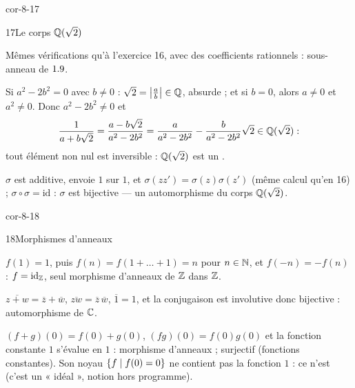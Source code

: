 \begin{blocLivre}{cor-8-17}
\begin{corrige}{17}{Le corps $\mathbb{Q}(\sqrt2)$}
\begin{questions}
  \item Mêmes vérifications qu'à l'exercice 16, avec des coefficients
    rationnels : sous-anneau de $1.9$.
  \item Si $a^{2}-2b^{2}=0$ avec $b\neq0$ : $\sqrt2=\bigl|\frac ab\bigr|\in\mathbb{Q}$,
    absurde ; et si $b=0$, alors $a\neq0$ et $a^{2}\neq0$. Donc
    $a^{2}-2b^{2}\neq0$ et
    \[
      \frac{1}{a+b\sqrt2}=\frac{a-b\sqrt2}{a^{2}-2b^{2}}
      =\frac{a}{a^{2}-2b^{2}}-\frac{b}{a^{2}-2b^{2}}\sqrt2\in\mathbb{Q}(\sqrt2) :
    \]
    tout élément non nul est inversible : $\mathbb{Q}(\sqrt2)$ est un
    .
  \item $\sigma$ est additive, envoie $1$ sur $1$, et
    $\sigma(zz')=\sigma(z)\sigma(z')$ (même calcul qu'en 16) ;
    $\sigma\circ\sigma=\mathrm{id}$ : $\sigma$ est bijective — un
    automorphisme du corps $\mathbb{Q}(\sqrt2)$.
\end{questions}
\end{corrige}
\end{blocLivre}

\begin{blocLivre}{cor-8-18}
\begin{corrige}{18}{Morphismes d'anneaux}
\begin{questions}
  \item $f(1)=1$, puis $f(n)=f(1+\dots+1)=n$ pour $n\in\mathbb{N}$, et
    $f(-n)=-f(n)$ : $f=\mathrm{id}_{\mathbb{Z}}$, seul morphisme d'anneaux de
    $\mathbb{Z}$ dans $\mathbb{Z}$.
  \item $\overline{z+w}=\overline{z}+\overline{w}$,
    $\overline{zw}=\overline{z}\,\overline{w}$, $\overline{1}=1$, et la
    conjugaison est involutive donc bijective : automorphisme de $\mathbb{C}$.
  \item $(f+g)(0)=f(0)+g(0)$, $(fg)(0)=f(0)g(0)$ et la fonction constante
    $1$ s'évalue en $1$ : morphisme d'anneaux ; surjectif (fonctions
    constantes). Son noyau $\left\{f \mid f(0)=0\right\}$ ne contient pas la
    fonction $1$ : ce n'est  (c'est un
    « idéal », notion hors programme).
\end{questions}
\end{corrige}
\end{blocLivre}

